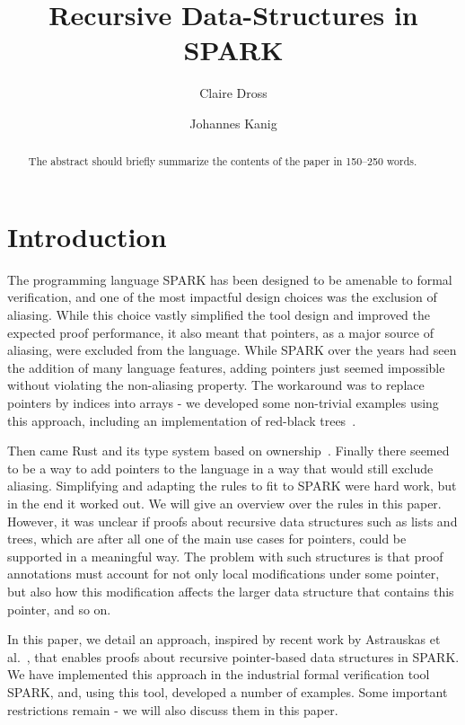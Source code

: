 \documentclass[runningheads]{llncs}
\begin{document}
%
\title{Recursive Data-Structures in SPARK}
%
\author{Claire Dross \and Johannes Kanig}
%
%
%
\maketitle              %
%
\begin{abstract}
The abstract should briefly summarize the contents of the paper in
150--250 words.

\end{abstract}
%
%
%
\section{Introduction}
The programming language SPARK has been designed to be amenable to formal verification, and one of the most impactful design choices was the exclusion of aliasing. While this choice vastly simplified the tool design and improved the expected proof performance, it also meant that pointers, as a major source of aliasing, were excluded from the language. While SPARK over the years had seen the addition of many language features, adding pointers just seemed impossible without violating the non-aliasing property. The workaround was to replace pointers by indices into arrays - we developed some non-trivial examples using this approach, including an implementation of red-black trees~\cite{dross2017auto}.

Then came Rust and its type system based on ownership~\cite{rust}. Finally there seemed to be a way to add pointers to the language in a way that would still exclude aliasing. Simplifying and adapting the rules to fit to SPARK were hard work, but in the end it worked out. We will give an overview over the rules in this paper.
However, it was unclear if proofs about recursive data structures such as lists and trees, which are after all one of the main use cases for pointers, could be supported in a meaningful way. The problem with such structures is that proof annotations must account for not only local modifications under some pointer, but also how this modification affects the larger data structure that contains this pointer, and so on.

In this paper, we detail an approach, inspired by recent work by Astrauskas et al.~\cite{astrauskas2019leveraging}, that enables proofs about recursive pointer-based data structures in SPARK. We have implemented this approach in the industrial formal verification tool SPARK, and, using this tool, developed a number of examples. Some important restrictions remain - we will also discuss them in this paper.
\end{document}
